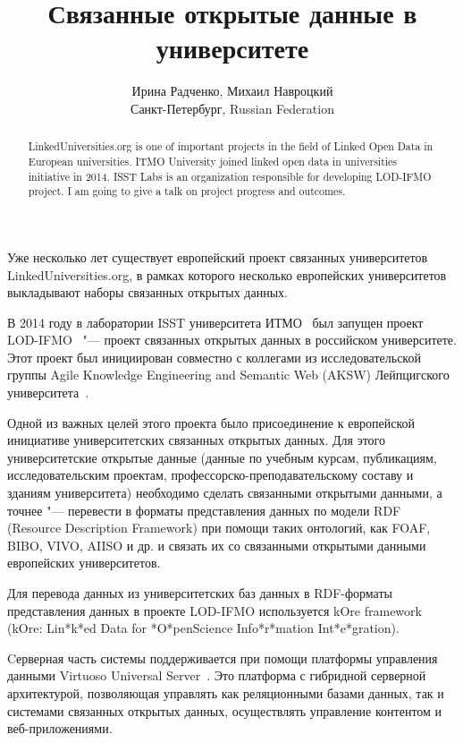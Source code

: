 \documentclass[10pt, a5paper]{article}
\begin{document}
\title{Связанные открытые данные в университете}
\author{Ирина Радченко, Михаил Навроцкий \\Санкт-Петербург, Russian Federation}
\maketitle
\begin{abstract}
LinkedUniversities.org is one of important projects in the field of Linked Open Data in European universities.
ITMO \linebreak University joined linked open data in universities initiative in 2014. ISST Labs is an organization responsible for developing LOD-IFMO project. I am going to give a talk on project progress and outcomes.
\end{abstract}
Уже несколько лет существует европейский проект связанных университетов LinkedUniversities.org, в рамках которого несколько европейских университетов выкладывают наборы связанных открытых данных.

В 2014 году в лаборатории ISST университета ИТМО~\cite{Radchenko1} был запущен проект LOD-IFMO~\cite{Radchenko2} "--- проект связанных открытых данных в российском университете. Этот проект был инициирован совместно с коллегами из исследовательской группы Agile Knowledge Engineering and Semantic Web (AKSW) Лейпцигского университета~\cite{Radchenko3}.

Одной из важных целей этого проекта было присоединение к европейской инициативе университетских связанных открытых данных. Для этого университетские открытые данные (данные по учебным курсам, публикациям, исследовательским проектам, \linebreak профессорско-преподавательскому составу и зданиям университета) необходимо сделать связанными открытыми данными, а точнее "--- перевести в форматы представления данных по модели RDF (Resource Description Framework) при помощи таких онтологий, как FOAF, BIBO, VIVO, AIISO и др. и связать их со связанными открытыми данными европейских университетов.

Для перевода данных из университетских баз данных в RDF-форматы представления данных в проекте LOD-IFMO используется kOre framework (kOre: Lin*k*ed Data for *O*penScience \linebreak Info*r*mation Int*e*gration).

Cерверная часть системы поддерживается при помощи платформы управления данными Virtuoso Universal Server~\cite{Radchenko4}. Это платформа с гибридной серверной архитектурой, позволяющая управлять как реляционными базами данных, так и системами связанных открытых данных, осуществлять управление контентом и веб-приложениями.
\end{document}
